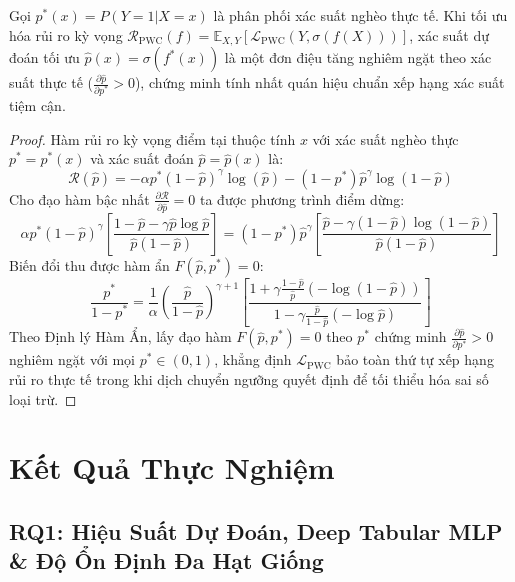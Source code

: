 \documentclass[conference]{IEEEtran}
\begin{document}
\begin{theorem}
Gọi $p^*(x) = P(Y=1 | X=x)$ là phân phối xác suất nghèo thực tế. Khi tối ưu hóa rủi ro kỳ vọng $\mathcal{R}_{\text{PWC}}(f) = \mathbb{E}_{X,Y} [\mathcal{L}_{\text{PWC}}(Y, \sigma(f(X)))]$, xác suất dự đoán tối ưu $\hat{p}(x) = \sigma(f^*(x))$ là một đơn điệu tăng nghiêm ngặt theo xác suất thực tế ($\frac{\partial \hat{p}}{\partial p^*} > 0$), chứng minh tính nhất quán hiệu chuẩn xếp hạng xác suất tiệm cận.
\end{theorem}
\begin{proof}
Hàm rủi ro kỳ vọng điểm tại thuộc tính $x$ với xác suất nghèo thực $p^* = p^*(x)$ và xác suất đoán $\hat{p} = \hat{p}(x)$ là:
$$\mathcal{R}(\hat{p}) = -\alpha p^* (1-\hat{p})^\gamma \log(\hat{p}) - (1-p^*) \hat{p}^\gamma \log(1-\hat{p})$$
Cho đạo hàm bậc nhất $\frac{\partial \mathcal{R}}{\partial \hat{p}} = 0$ ta được phương trình điểm dừng:
$$\alpha p^* (1-\hat{p})^\gamma \left[ \frac{1-\hat{p} - \gamma \hat{p} \log \hat{p}}{\hat{p}(1-\hat{p})} \right] = (1-p^*) \hat{p}^\gamma \left[ \frac{\hat{p} - \gamma (1-\hat{p}) \log(1-\hat{p})}{\hat{p}(1-\hat{p})} \right]$$
Biến đổi thu được hàm ẩn $F(\hat{p}, p^*) = 0$:
$$\frac{p^*}{1-p^*} = \frac{1}{\alpha} \left( \frac{\hat{p}}{1-\hat{p}} \right)^{\gamma+1} \left[ \frac{1 + \gamma \frac{1-\hat{p}}{\hat{p}} (-\log(1-\hat{p}))}{1 - \gamma \frac{\hat{p}}{1-\hat{p}} (-\log \hat{p})} \right]$$
Theo Định lý Hàm Ẩn, lấy đạo hàm $F(\hat{p}, p^*) = 0$ theo $p^*$ chứng minh $\frac{\partial \hat{p}}{\partial p^*} > 0$ nghiêm ngặt với mọi $p^* \in (0, 1)$, khẳng định $\mathcal{L}_{\text{PWC}}$ bảo toàn thứ tự xếp hạng rủi ro thực tế trong khi dịch chuyển ngưỡng quyết định để tối thiểu hóa sai số loại trừ.
\end{proof}

\section{Kết Quả Thực Nghiệm}

\subsection{RQ1: Hiệu Suất Dự Đoán, Deep Tabular MLP & Độ Ổn Định Đa Hạt Giống}
\end{document}
